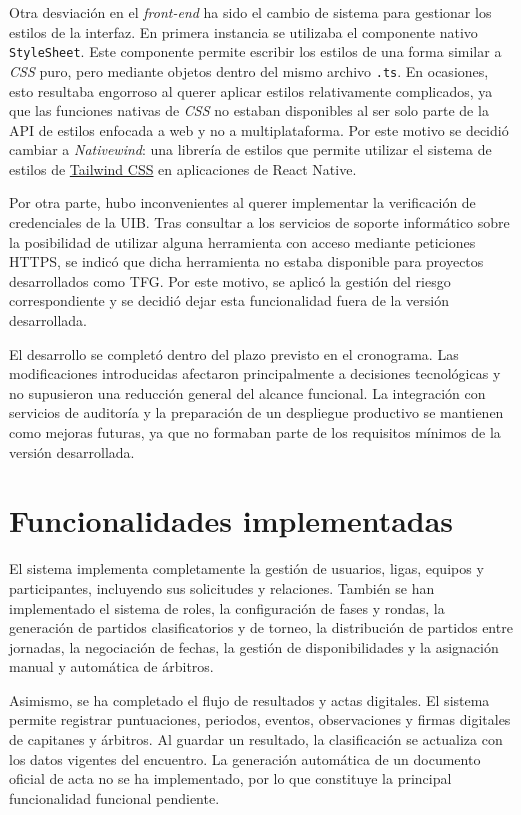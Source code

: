 Otra desviación en el \emph{front-end} ha sido el cambio de sistema para gestionar los estilos de la interfaz. En primera instancia se utilizaba el componente nativo \texttt{StyleSheet}. Este componente permite escribir los estilos de una forma similar a \emph{CSS} puro, pero mediante objetos dentro del mismo archivo \texttt{.ts}. En ocasiones, esto resultaba engorroso al querer aplicar estilos relativamente complicados, ya que las funciones nativas de \emph{CSS} no estaban disponibles al ser solo parte de la API de estilos enfocada a web y no a multiplataforma. Por este motivo se decidió cambiar a \emph{Nativewind}: una librería de estilos que permite utilizar el sistema de estilos de \href{https://www.nativewind.dev/docs/getting-started/installation}{Tailwind CSS} en aplicaciones de React Native.

Por otra parte, hubo inconvenientes al querer implementar la verificación de credenciales de la \ac{UIB}. Tras consultar a los servicios de soporte informático sobre la posibilidad de utilizar alguna herramienta con acceso mediante peticiones HTTPS, se indicó que dicha herramienta no estaba disponible para proyectos desarrollados como \ac{TFG}. Por este motivo, se aplicó la gestión del riesgo correspondiente y se decidió dejar esta funcionalidad fuera de la versión desarrollada.

El desarrollo se completó dentro del plazo previsto en el cronograma. Las modificaciones introducidas afectaron principalmente a decisiones tecnológicas y no supusieron una reducción general del alcance funcional. La integración con servicios de auditoría y la preparación de un despliegue productivo se mantienen como mejoras futuras, ya que no formaban parte de los requisitos mínimos de la versión desarrollada.

\section{Funcionalidades implementadas}
El sistema implementa completamente la gestión de usuarios, ligas, equipos y participantes, incluyendo sus solicitudes y relaciones. También se han implementado el sistema de roles, la configuración de fases y rondas, la generación de partidos clasificatorios y de torneo, la distribución de partidos entre jornadas, la negociación de fechas, la gestión de disponibilidades y la asignación manual y automática de árbitros.

Asimismo, se ha completado el flujo de resultados y actas digitales. El sistema permite registrar puntuaciones, periodos, eventos, observaciones y firmas digitales de capitanes y árbitros. Al guardar un resultado, la clasificación se actualiza con los datos vigentes del encuentro. La generación automática de un documento oficial de acta no se ha implementado, por lo que constituye la principal funcionalidad funcional pendiente.

